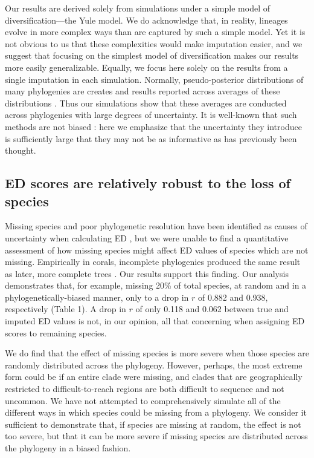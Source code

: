 \documentclass[12pt,english]{article}
\begin{document}
Our results are derived solely from simulations under a simple model of
diversification---the Yule model. We do acknowledge that, in reality, lineages
evolve in more complex ways than are captured by such a simple model. Yet it is
not obvious to us that these complexities would make imputation easier, and we
suggest that focusing on the simplest model of diversification makes our results
more easily generalizable. Equally, we focus here solely on the results from a
single imputation in each simulation. Normally, pseudo-posterior distributions
of many phylogenies are creates and results reported across averages of these
distributions \autocite{Kuhn2011}. Thus our simulations show that these averages
are conducted across phylogenies with large degrees of uncertainty. It is
well-known that such methods are not biased \autocite[indeed, this was
originally shown by][]{Kuhn2011}: here we emphasize that the uncertainty they
introduce is sufficiently large that they may not be as informative as has
previously been thought.

\subsection*{ED scores are relatively robust to the loss of species}
Missing species and poor phylogenetic resolution have been identified as causes
of uncertainty when calculating ED \autocite{Isaac2007}, but we were unable to
find a quantitative assessment of how missing species might affect ED values of
species which are not missing. Empirically in corals, incomplete phylogenies
produced the same result as later, more complete trees \autocite{Curnick2015}.
Our results support this finding. Our analysis demonstrates that, for example,
missing 20\% of total species, at random and in a phylogenetically-biased
manner, only to a drop in $r$ of 0.882 and 0.938, respectively (Table 1). A drop
in $r$ of only 0.118 and 0.062 between true and imputed ED values is not, in our
opinion, all that concerning when assigning ED scores to remaining species.

We do find that the effect of missing species is more severe when those species
are randomly distributed across the phylogeny. However, perhaps, the most
extreme form could be if an entire clade were missing, and clades that are
geographically restricted to difficult-to-reach regions \autocite[][]{Arrigoni2012} are both
difficult to sequence and not uncommon. We have not attempted to comprehensively
simulate all of the different ways in which species could be missing from a
phylogeny. We consider it sufficient to demonstrate that, if species are missing
at random, the effect is not too severe, but that it can be more severe if
missing species are distributed across the phylogeny in a biased fashion. 
\end{document}
